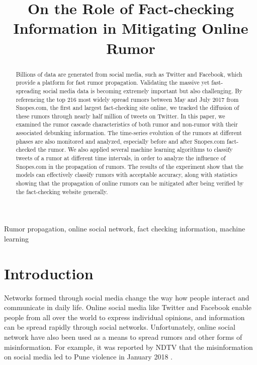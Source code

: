 \documentclass[conference]{IEEEtran}
\begin{document}
	
	\title{On the Role of Fact-checking Information in Mitigating Online Rumor\\}
	
	\author{
		\and
	}
	
	\maketitle
	
	\begin{abstract}
		Billions of data are generated from social media, such as Twitter and Facebook, which provide a platform for fast rumor propagation. Validating the massive yet fast-spreading social media data is becoming extremely important but also challenging. By referencing the top 216 most widely spread rumors between May and July 2017 from Snopes.com, the first and largest fact-checking site online, we tracked the diffusion of these rumors through nearly half million of tweets on Twitter. In this paper, we examined the rumor cascade characteristics of both rumor and non-rumor with their associated debunking information. The time-series evolution of the rumors at different phases are also monitored and analyzed, especially before and after Snopes.com fact-checked the rumor. We also applied several machine learning algorithms to classify tweets of a rumor at different time intervals, in order to analyze the influence of Snopes.com in the propagation of rumors. The results of the experiment show that the models can effectively classify rumors with acceptable accuracy, along with statistics showing that the propagation of online rumors can be mitigated after being verified by the fact-checking website generally. \\
	\end{abstract}
	
	\begin{IEEEkeywords}
		Rumor propagation, online social network, fact checking information, machine learning
	\end{IEEEkeywords}
	
	\section{Introduction}
	Networks formed through social media change the way how people interact and communicate in daily life. Online social media like Twitter and Facebook enable people from all over the world to express individual opinions, and information can be spread rapidly through social networks. Unfortunately, online social network have also been used as a means to spread rumors and other forms of misinformation. For example, it was reported by NDTV that the misinformation on social media led to Pune violence in January 2018 \cite{tong2018misinformation}. 
	
\end{document}
